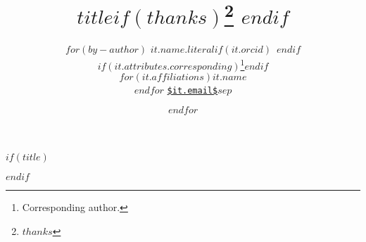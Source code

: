 $if(title)$
\title{\bigskip \bigskip $title$$if(thanks)$\thanks{$thanks$} $endif$ }
$endif$

\author{
$for(by-author)$
{\large $it.name.literal$$if(it.orcid)$~$endif$}%
$if(it.attributes.corresponding)$\thanks{Corresponding author.}$endif$ \\%
$for(it.affiliations)${\normalsize\emph{$it.name$}} \\$endfor$%
{\footnotesize \texttt{\url{$it.email$}}}\vspace*{0.2in}\newline $sep$ \and
$endfor$
}

\date{}
